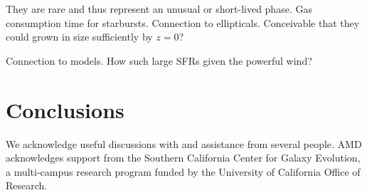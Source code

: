 \documentclass[apj]{emulateapj}
\begin{document}
They are rare and thus represent an unusual or short-lived phase.  Gas
consumption time for starbursts.  Connection to ellipticals.
Conceivable that they could grown in size sufficiently by $z=0$?

Connection to models.  How such large SFRs given the powerful wind?  



\section{Conclusions}

\acknowledgments

We acknowledge useful discussions with and assistance from several
people.  AMD acknowledges support from the Southern California Center
for Galaxy Evolution, a multi-campus research program funded by the
University of California Office of Research.



\end{document}
